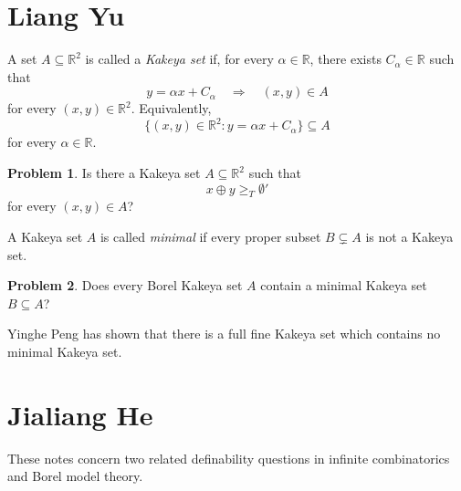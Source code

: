 \documentclass[11pt]{amsart}
\theoremstyle{definition}
\newtheorem{problem}{Problem}[section]
\newtheorem{definition}[theorem]{Definition}
\newcommand{\abstractauthor}[1]{\noindent\textbf{#1}\par\vspace{0.3\baselineskip}}
\newcommand{\abstractbody}[1]{\noindent #1 \par \vspace{\baselineskip}}
\begin{document}
\bigskip
\bigskip

\section{Liang Yu}
\abstractbody{

A set $A\subseteq\mathbb{R}^2$ is called a \emph{Kakeya set} if, for every
$\alpha\in\mathbb{R}$, there exists $C_\alpha\in\mathbb{R}$ such that
\[
    y=\alpha x+C_\alpha
    \quad\Longrightarrow\quad
    (x,y)\in A
\]
for every $(x,y)\in\mathbb{R}^2$. Equivalently,
\[
    \bigl\{(x,y)\in\mathbb{R}^2:y=\alpha x+C_\alpha\bigr\}
    \subseteq A
\]
for every $\alpha\in\mathbb{R}$.

\begin{problem}
    Is there a Kakeya set $A\subseteq\mathbb{R}^2$ such that
    \[
        x\oplus y\geq_T\emptyset'
    \]
    for every $(x,y)\in A$?
\end{problem}

A Kakeya set $A$ is called \emph{minimal} if every proper subset
$B\subsetneq A$ is not a Kakeya set.

\begin{problem}
    Does every Borel Kakeya set $A$ contain a minimal Kakeya set
    $B\subseteq A$?
\end{problem}

Yinghe Peng has shown that there is a full fine Kakeya set which contains no minimal Kakeya set.
}




\bigskip
\bigskip

\section{Jialiang He}
These notes concern two related definability questions in infinite combinatorics and Borel model theory. 


\end{document}
